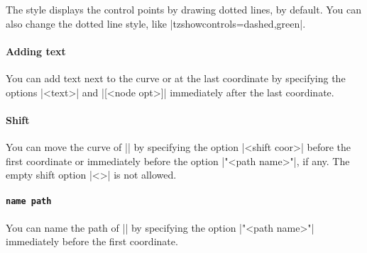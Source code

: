 The style  displays the control points by drawing dotted lines, by default.
You can also change the dotted line style, like |tzshowcontrols={dashed,green}|.


\begin{tzcode}{.3}
\end{tzcode}

\paragraph{Adding text}
You can add text next to the curve or at the last coordinate
by specifying the options |{<text>}| and |[<node opt>]| immediately after the last coordinate.


\begin{tzcode}{.3}
\end{tzcode}

\paragraph{Shift}
You can move the curve of |\tzbezier| by specifying the option |<shift coor>| before the first coordinate or immediately before the option |"<path name>"|, if any.
The empty shift option |<>| is not allowed.

\begin{tzcode}{.3}
\end{tzcode}

\paragraph{\texttt{name path}}
You can name the path of |\tzbezier| by specifying the option |"<path name>"| immediately before the first coordinate.

